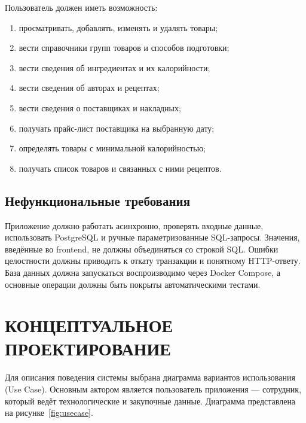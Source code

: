 \documentclass[14pt,a4paper]{extarticle}
\begin{document}
Пользователь должен иметь возможность:

\begin{enumerate}[leftmargin=1.25cm]
    \item просматривать, добавлять, изменять и удалять товары;
    \item вести справочники групп товаров и способов подготовки;
    \item вести сведения об ингредиентах и их калорийности;
    \item вести сведения об авторах и рецептах;
    \item вести сведения о поставщиках и накладных;
    \item получать прайс-лист поставщика на выбранную дату;
    \item определять товары с минимальной калорийностью;
    \item получать список товаров и связанных с ними рецептов.
\end{enumerate}

\subsection{Нефункциональные требования}

Приложение должно работать асинхронно, проверять входные данные, использовать
PostgreSQL и ручные параметризованные SQL-запросы. Значения, введённые во
frontend, не должны объединяться со строкой SQL. Ошибки целостности должны
приводить к откату транзакции и понятному HTTP-ответу. База данных должна
запускаться воспроизводимо через Docker Compose, а основные операции должны
быть покрыты автоматическими тестами.

\clearpage
\section{КОНЦЕПТУАЛЬНОЕ ПРОЕКТИРОВАНИЕ}

Для описания поведения системы выбрана диаграмма вариантов использования
(Use Case). Основным актором является пользователь приложения --- сотрудник,
который ведёт технологические и закупочные данные. Диаграмма представлена на
рисунке~\ref{fig:usecase}.
\end{document}
